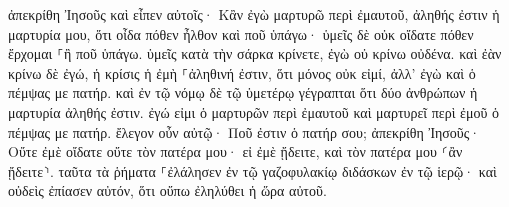 \documentclass{openreader}
\begin{document}
ἀπεκρίθη Ἰησοῦς καὶ εἶπεν αὐτοῖς· Κἂν ἐγὼ μαρτυρῶ περὶ ἐμαυτοῦ, ἀληθής ἐστιν ἡ μαρτυρία μου, ὅτι οἶδα πόθεν ἦλθον καὶ ποῦ ὑπάγω· ὑμεῖς δὲ οὐκ οἴδατε πόθεν ἔρχομαι ⸀ἢ ποῦ ὑπάγω. 
ὑμεῖς κατὰ τὴν σάρκα κρίνετε, ἐγὼ οὐ κρίνω οὐδένα. 
καὶ ἐὰν κρίνω δὲ ἐγώ, ἡ κρίσις ἡ ἐμὴ ⸀ἀληθινή ἐστιν, ὅτι μόνος οὐκ εἰμί, ἀλλ’ ἐγὼ καὶ ὁ πέμψας με πατήρ. 
καὶ ἐν τῷ νόμῳ δὲ τῷ ὑμετέρῳ γέγραπται ὅτι δύο ἀνθρώπων ἡ μαρτυρία ἀληθής ἐστιν. 
ἐγώ εἰμι ὁ μαρτυρῶν περὶ ἐμαυτοῦ καὶ μαρτυρεῖ περὶ ἐμοῦ ὁ πέμψας με πατήρ. 
ἔλεγον οὖν αὐτῷ· Ποῦ ἐστιν ὁ πατήρ σου; ἀπεκρίθη Ἰησοῦς· Οὔτε ἐμὲ οἴδατε οὔτε τὸν πατέρα μου· εἰ ἐμὲ ᾔδειτε, καὶ τὸν πατέρα μου ⸂ἂν ᾔδειτε⸃. 
ταῦτα τὰ ῥήματα ⸀ἐλάλησεν ἐν τῷ γαζοφυλακίῳ διδάσκων ἐν τῷ ἱερῷ· καὶ οὐδεὶς ἐπίασεν αὐτόν, ὅτι οὔπω ἐληλύθει ἡ ὥρα αὐτοῦ. 
\end{document}
